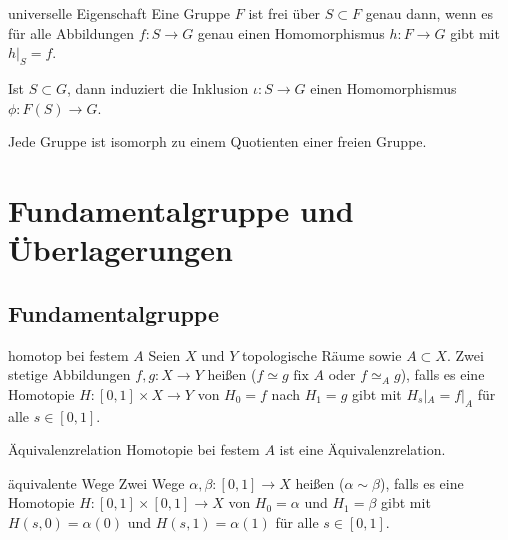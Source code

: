 \linie

\begin{Satz}{universelle Eigenschaft}
    Eine Gruppe $F$ ist frei über $S \subset F$ genau dann, wenn es für alle
    Abbildungen $f\colon S \rightarrow G$ genau einen Homomorphismus
    $h\colon F \rightarrow G$ gibt mit $h|_S = f$.
\end{Satz}

\begin{Kor}
    Ist $S \subset G$, dann induziert die Inklusion
    $\iota\colon S \rightarrow G$ einen Homomorphismus \\
    $\phi\colon F(S) \rightarrow G$.
\end{Kor}

\begin{Kor}
    Jede Gruppe ist isomorph zu einem Quotienten einer freien Gruppe.
\end{Kor}

\pagebreak

\section{%
    Fundamentalgruppe und Überlagerungen%
}

\subsection{%
    Fundamentalgruppe%
}

\begin{Def}{homotop bei festem $A$}
    Seien $X$ und $Y$ topologische Räume sowie $A \subset X$.
    Zwei stetige Abbildungen $f, g\colon X \rightarrow Y$ heißen
     ($f \simeq g \text{ fix } A$ oder
    $f \simeq_A g$), falls es eine Homotopie
    $H\colon [0, 1] \times X \rightarrow Y$ von $H_0 = f$ nach $H_1 = g$ gibt
    mit $H_s|_A = f|_A$ für alle $s \in [0, 1]$.
\end{Def}

\begin{Lemma}{Äquivalenzrelation}
    Homotopie bei festem $A$ ist eine Äquivalenzrelation.
\end{Lemma}

\linie

\begin{Def}{äquivalente Wege}
    Zwei Wege $\alpha, \beta\colon [0, 1] \rightarrow X$ heißen
     ($\alpha \sim \beta$), falls es eine Homotopie
    $H\colon [0, 1] \times [0, 1] \rightarrow X$ von $H_0 = \alpha$ und
    $H_1 = \beta$ gibt mit $H(s, 0) = \alpha(0)$ und $H(s, 1) = \alpha(1)$
    für alle $s \in [0, 1]$.
\end{Def}

